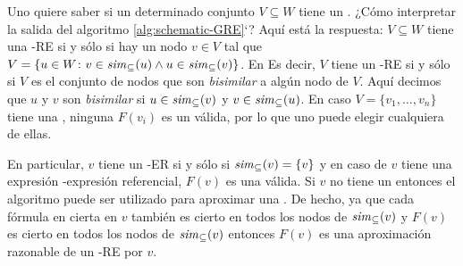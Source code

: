 

%

\iffullversion Uno quiere saber si un determinado conjunto  $V\subseteq W$
tiene un \posre. ¿C\'omo interpretar la salida del algoritmo
\ref{alg:schematic-GRE}`? Aqu\'i est\'a la respuesta: $V\subseteq W$ tiene una
\EL-RE si y s\'olo si hay un nodo $v\in V$ tal que  $V=\{u\in W\colon
v\in{\it sim}_\subseteq(u) \wedge u\in{\it sim}_\subseteq(v)\}$. En
Es decir, $V$ tiene un \EL-RE si y s\'olo si $V$ es el conjunto de nodos que son
\emph{bisimilar} a alg\'un nodo de $V$. Aqu\'i decimos que $u$ y $v$
son \emph{bisimilar} si $u\in{\it sim}_\subseteq(v)$ y
$v\in{\it sim}_\subseteq(u)$. En caso  $V=\{v_1,\dots,v_n\}$ tiene una
\posre, ninguna $F(v_i)$ es un \posre v\'alida, por lo que uno puede elegir cualquiera de ellas.

%

En particular, $v$ tiene un \EL-ER si y s\'olo si ${\it sim}_\subseteq(v)=\{v\}$
y en caso de $v$ tiene una expresi\'on \EL-expresi\'on referencial, $F(v)$ es una v\'alida. Si $v$ no tiene un \posre entonces el algoritmo puede ser
utilizado para aproximar una \posre. De hecho, ya que cada f\'ormula en cierta en $v$
tambi\'en es cierto en todos los nodos de ${\it sim}_\subseteq(v)$ y $F(v)$
es cierto en todos los nodos de ${\it sim}_\subseteq(v)$ entonces $F(v)$ es una
aproximaci\'on razonable de un \EL-RE por $v$.

